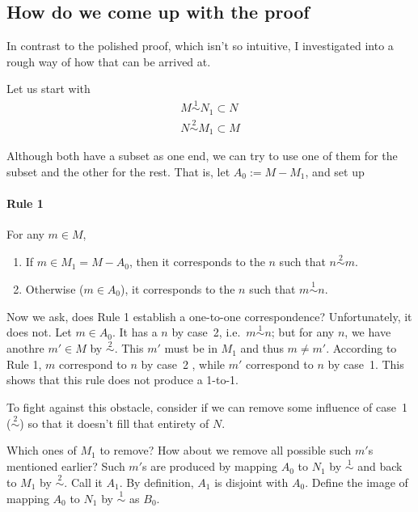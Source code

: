 \subsection{How do we come up with the proof}
In contrast to the polished proof, which isn't so intuitive, I investigated
into a rough way of how that can be arrived at.

\def\corro{\mathop{\sim}\limits^1}
\def\corrt{\mathop{\sim}\limits^2}

Let us start with 
\begin{align*}
M \corro N_1 \subset N \\
N \corrt M_1 \subset M
\end{align*}

Although both have a subset as one end, we can try to use one of them for the
subset and the other for the rest. That is, let $A_0 := M-M_1$, and set up

\paragraph{Rule 1}
For any $m \in M$,
\begin{enumerate}
	\item If $m \in M_1 = M-A_0$, then it corresponds to the $n$ such that $n
		\corrt m$.
	\item Otherwise ($m \in A_0$), it corresponds to the $n$ such that $m
		\corro n$.
\end{enumerate}

Now we ask, does Rule 1 establish a one-to-one correspondence? Unfortunately,
it does not. Let $m \in A_0$. It has a $n$ by case~2, i.e.\ $m \corro n$;
but for any $n$, we have anothre $m' \in M$ by $\corrt$. This $m'$ must be in
$M_1$ and thus $m \ne m'$. According to  Rule 1, $m$ correspond to $n$ by
case~2 , while $m'$ correspond to $n$ by case~1. This shows that this rule does
not produce a 1-to-1.

To fight against this obstacle, consider if we can remove some influence of
case~1 ($\corrt$) so that it doesn't fill that entirety of $N$. 

Which ones of $M_1$ to remove? How about we remove all possible such $m'$s
mentioned earlier? Such $m'$s are produced by mapping $A_0$ to $N_1$ by $\corro$
and back to $M_1$ by $\corrt$.  Call it $A_1$. By definition, $A_1$ is
disjoint with $A_0$. Define the image of mapping $A_0$ to $N_1$ by $\corro$ as
$B_0$.

